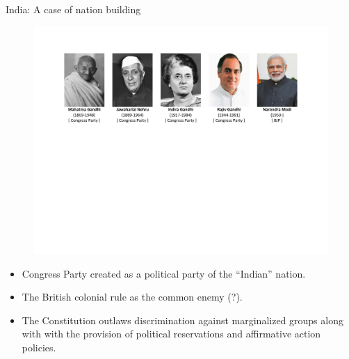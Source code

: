 \documentclass[10pt]{beamer}
\begin{document}
\begin{frame}{India: A case of nation building}
	\begin{figure}
	\centering
	\includegraphics[scale=0.5]{Figs/India/leaders}
	\end{figure}
	\pause
	\begin{itemize}
	\item Congress Party created as a political party of the ``Indian'' nation.
	\item The British colonial rule as the common enemy (?).
	\item The Constitution outlaws discrimination against marginalized groups along with with the provision of political reservations and affirmative action policies.
	\end{itemize}
\end{frame}
\end{document}
